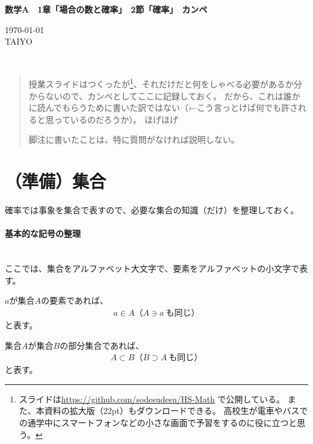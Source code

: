\documentclass[luatexja,fontsize=12pt]{jlreq}\usepackage{ifthen}\newcounter{enlarge}\setcounter{enlarge}{1}
\newcommand{\LS}[2]{\ifthenelse{\value{enlarge}=2 \OR \value{enlarge}=3}{#1}{#2}}
\newcommand{\LO}[1]{\LS{#1}{\relax}}
\begin{document}
{\Large%
\noindent
\textbf{%
数学A　1章「場合の数と確率」　2節「確率」　カンペ
\LO{\\ \color{teal} 〈拡大版〉}}
}

\begin{flushleft}
\today \\
TAIYO
\end{flushleft}

{\footnotesize%
\mbox{}\\

}
\begin{quotation}
授業スライドはつくったが\footnote{%
スライドは\url{https://github.com/sodesudesu/HS-Math}
で公開している。
また、本資料の拡大版（22pt）もダウンロードできる。
高校生が電車やバスでの通学中にスマートフォンなどの小さな画面で予習をするのに役に立つと思う。}、それだけだと何をしゃべる必要があるか分からないので、カンペとしてここに記録しておく。
だから、これは誰かに読んでもらうために書いた訳ではない（←こう言っとけば何でも許されると思っているのだろうか）。
ほげほげ

脚注に書いたことは、特に質問がなければ説明しない。
\end{quotation}

\section{（準備）集合}

確率では事象を集合で表すので、必要な集合の知識（だけ）を整理しておく。
\mbox{}\\

\paragraph{基本的な記号の整理}\mbox{}\\
\indent
ここでは、集合をアルファベット大文字で、要素をアルファベットの小文字で表す。

$a$が集合$A$の要素であれば、
\begin{align} \label{eq:0_1}
a \in A　（A \ni a~も同じ）
\end{align}
と表す。

集合$A$が集合$B$の部分集合であれば、
\begin{align} \label{eq:0_2}
A \subset B　（B \supset A~も同じ）
\end{align}
と表す。
\end{document}
